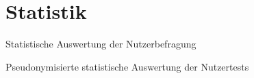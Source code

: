\chapter{Statistik}\label{app:statistik}
Statistische Auswertung der Nutzerbefragung

Pseudonymisierte statistische Auswertung der Nutzertests